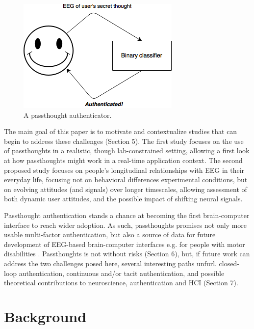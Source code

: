 \documentclass[sigconf]{acmart}
\begin{document}
\label{fig:diagram}
\begin{figure}[htbp]
\centering
\includegraphics[width=.9\linewidth]{./figures/passthoughts-diagram.png}
\caption{A passthought authenticator.}
\end{figure}

The main goal of this paper is to motivate and contextualize studies that can begin to address these challenges (Section 5).
The first study focuses on the use of passthoughts in a realistic, though lab-constrained setting, 
allowing a first look at how passthoughts might work in a real-time application context.
The second proposed study focuses on people's longitudinal relationships with EEG in their everyday life,
focusing not on behavioral differences experimental conditions, but on evolving attitudes (and signals) over longer timescales,
allowing assessment of both dynamic user attitudes, and the possible impact of shifting neural signals.

Passthought authentication stands a chance at becoming the first brain-computer interface to reach wider adoption. 
As such, passthoughts promises not only more usable multi-factor authentication,
but also a source of data for future development of EEG-based brain-computer interfaces
e.g. for people with motor disabilities \cite{Mattia2013}.
Passthoughts is not without risks (Section 6),
but, if future work can address the two challenges posed here, several interesting paths unfurl.
closed-loop authentication, continuous and/or tacit authentication, 
and possible theoretical contributions to neuroscience, authentication and HCI (Section 7).

\section{Background}
\label{sec:orgf2a94d5}
\end{document}
